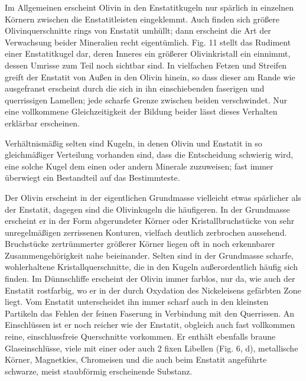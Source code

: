 \documentclass[a4paper, 11pt, oneside]{article}
\begin{document}
Im Allgemeinen erscheint Olivin in den Enstatitkugeln nur spärlich in einzelnen Körnern zwischen die Enstatitleisten eingeklemmt. Auch finden sich größere Olivinquerschnitte rings von Enstatit umhüllt; dann erscheint die Art der Verwachsung beider Mineralien recht eigentümlich. Fig. 11 stellt das Rudiment einer Enstatitkugel dar, deren Inneres ein größerer Olivinkristall ein einnimmt, dessen Umrisse zum Teil noch sichtbar sind. In vielfachen Fetzen und Streifen greift der Enstatit von Außen in den Olivin hinein, so dass dieser am Rande wie ausgefranst erscheint durch die sich in ihn einschiebenden faserigen und querrissigen Lamellen; jede scharfe Grenze zwischen beiden verschwindet. Nur eine vollkommene Gleichzeitigkeit der Bildung beider lässt dieses Verhalten erklärbar erscheinen.

Verhältnismäßig selten sind Kugeln, in denen Olivin und Enstatit in so gleichmäßiger Verteilung vorhanden sind, dass die Entscheidung schwierig wird, eine solche Kugel dem einen oder andern Minerale zuzuweisen; fast immer überwiegt ein Bestandteil auf das Bestimmteste.

Der Olivin erscheint in der eigentlichen Grundmasse vielleicht etwas spärlicher als der Enstatit, dagegen sind die Olivinkugeln die häufigeren. In der Grundmasse erscheint er in der Form abgerundeter Körner oder Kristallbruchstücke von sehr unregelmäßigen zerrissenen Konturen, vielfach deutlich zerbrochen aussehend. Bruchstücke zertrümmerter größerer Körner liegen oft in noch erkennbarer Zusammengehörigkeit nahe beieinander. Selten sind in der Grundmasse scharfe, wohlerhaltene Kristallquerschnitte, die in den Kugeln außerordentlich häufig sich finden. Im Dünnschliffe erscheint der Olivin immer farblos, nur da, wie auch der Enstatit rostfarbig, wo er in der durch Oxydation des Nickeleisens gefärbten Zone liegt. Vom Enstatit unterscheidet ihn immer scharf auch in den kleinsten Partikeln das Fehlen der feinen Faserung in Verbindung mit den Querrissen. An Einschlüssen ist er noch reicher wie der Enstatit, obgleich auch fast vollkommen reine, einschlussfreie Querschnitte vorkommen. Er enthält ebenfalls braune Glaseinschlüsse, viele mit einer oder auch 2 fixen Libellen (Fig. 6, d), metallische Körner, Magnetkies, Chromeisen und die auch beim Enstatit angeführte schwarze, meist staubförmig erscheinende Substanz.
\end{document}
